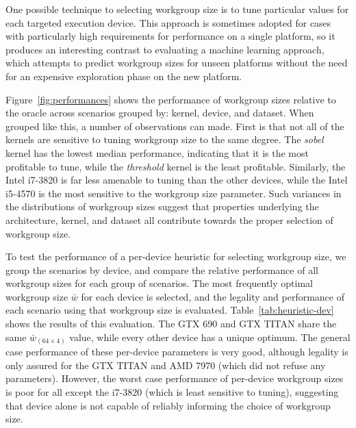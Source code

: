 One possible technique to selecting workgroup size is to tune
particular values for each targeted execution device. This approach is
sometimes adopted for cases with particularly high requirements for
performance on a single platform, so it produces an interesting
contrast to evaluating a machine learning approach, which attempts to
predict workgroup sizes for unseen platforms without the need for an
expensive exploration phase on the new platform.

Figure~\ref{fig:performances} shows the performance of workgroup sizes
relative to the oracle across scenarios grouped by: kernel, device,
and dataset. When grouped like this, a number of observations can
made. First is that not all of the kernels are sensitive to tuning
workgroup size to the same degree. The \emph{sobel} kernel has the
lowest median performance, indicating that it is the most profitable
to tune, while the \emph{threshold} kernel is the least
profitable. Similarly, the Intel i7-3820 is far less amenable to
tuning than the other devices, while the Intel i5-4570 is the most
sensitive to the workgroup size parameter. Such variances in the
distributions of workgroup sizes suggest that properties underlying
the architecture, kernel, and dataset all contribute towards the
proper selection of workgroup size.

To test the performance of a per-device heuristic for selecting
workgroup size, we group the scenarios by device, and compare the
relative performance of all workgroup sizes for each group of
scenarios. The most frequently optimal workgroup size $\bar{w}$ for
each device is selected, and the legality and performance of each
scenario using that workgroup size is evaluated.
Table~\ref{tab:heuristic-dev} shows the results of this evaluation.
The GTX 690 and GTX TITAN share the same $\bar{w}_{(64 \times 4)}$
value, while every other device has a unique optimum. The general case
performance of these per-device parameters is very good, although
legality is only assured for the GTX TITAN and AMD 7970 (which did not
refuse any parameters). However, the worst case performance of
per-device workgroup sizes is poor for all except the i7-3820 (which
is least sensitive to tuning), suggesting that device alone is not
capable of reliably informing the choice of workgroup size.


